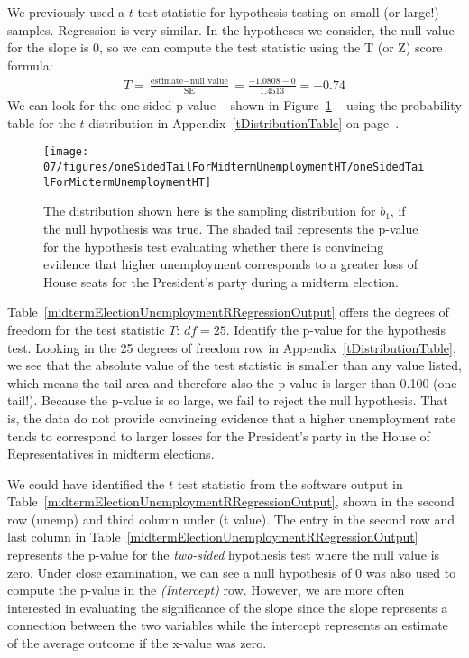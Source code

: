 We previously used a $t$ test statistic for hypothesis testing on small (or large!) samples. Regression is very similar. In the hypotheses we consider, the null value for the slope is 0, so we can compute the test statistic using the T (or Z) score formula:
\begin{align*}
T = \frac{\text{estimate} - \text{null value}}{\text{SE}} = \frac{-1.0808 - 0}{1.4513} = -0.74
\end{align*}
We can look for the one-sided p-value -- shown in Figure~\ref{oneSidedTailForMidtermUnemploymentHT} -- using the probability table for the $t$ distribution in Appendix~\ref{tDistributionTable} on page~\pageref{tDistributionTable}.
\begin{figure}
\centering
\texttt{[image: 07/figures/oneSidedTailForMidtermUnemploymentHT/oneSidedTailForMidtermUnemploymentHT]}
\caption{The distribution shown here is the sampling distribution for $b_1$, if the null hypothesis was true. The shaded tail represents the p-value for the hypothesis test evaluating whether there is convincing evidence that higher unemployment corresponds to a greater loss of House seats for the President's party during a midterm election.}
\label{oneSidedTailForMidtermUnemploymentHT}
\end{figure}

\pagebreak

\begin{example}{Table~\ref{midtermElectionUnemploymentRRegressionOutput} offers the degrees of freedom for the test statistic $T$: $df=25$. Identify the p-value for the hypothesis test.}
Looking in the 25 degrees of freedom row in Appendix~\ref{tDistributionTable}, we see that the absolute value of the test statistic is smaller than any value listed, which means the tail area and therefore also the p-value is larger than 0.100 (one tail!). Because the p-value is so large, we fail to reject the null hypothesis. That is, the data do not provide convincing evidence that a higher unemployment rate tends to correspond to larger losses for the President's party in the House of Representatives in midterm elections.
\end{example}

We could have identified the $t$ test statistic from the software output in Table~\ref{midtermElectionUnemploymentRRegressionOutput}, shown in the second row (unemp) and third column under (t value). The entry in the second row and last column in Table~\ref{midtermElectionUnemploymentRRegressionOutput} represents the p-value for the \emph{two-sided} hypothesis test where the null value is zero. Under close examination, we can see a null hypothesis of 0 was also used to compute the p-value in the \emph{(Intercept)} row. However, we are more often interested in evaluating the significance of the slope since the slope represents a connection between the two variables while the intercept represents an estimate of the average outcome if the x-value was zero.

